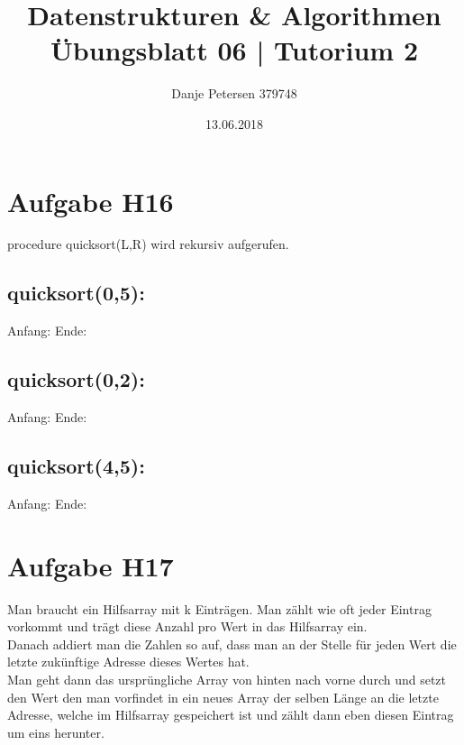 \documentclass[a4paper,graphics,14pt]{article}
\author		{ \Large Danje Petersen 379748}
\title{ \Huge Datenstrukturen \& Algorithmen \\
		\huge Übungsblatt 06 | Tutorium 2}
\date{13.06.2018}
\newcommand{\aufgabe}[1]{\section*{Aufgabe #1}}
\newcommand{\apt}[1]{\subsection*{#1:} }
\begin{document}
\doublespacing
\maketitle
\onehalfspacing

\aufgabe{H16}
\doublespacing

\dq procedure quicksort(L,R)\dq{} wird rekursiv aufgerufen.

\apt{quicksort(0,5)}

Anfang: \hspace{1,05cm} 
\hspace{1cm}
Ende: \hspace{1,33cm} \\

\apt{quicksort(0,2)}
Anfang: \hspace{1cm}
\hspace{2,71cm} 
Ende: \hspace{1,33cm} \\

\apt{quicksort(4,5)}
Anfang: \hspace{1cm} 
\hspace{3,22cm}
Ende: \hspace{1,33cm} \\


\aufgabe{H17}
\onehalfspacing
Man braucht ein Hilfsarray mit k Einträgen. Man zählt wie oft jeder Eintrag vorkommt und trägt diese Anzahl pro Wert in das Hilfsarray ein. \\
Danach addiert man die Zahlen so auf, dass man an der Stelle für jeden Wert die letzte zukünftige Adresse dieses Wertes hat. \\
Man geht dann das ursprüngliche Array von hinten nach vorne durch und setzt den Wert den man vorfindet in ein neues Array der selben Länge an die letzte Adresse, welche im Hilfsarray gespeichert ist und zählt dann eben diesen Eintrag um eins herunter. \\
\end{document}
